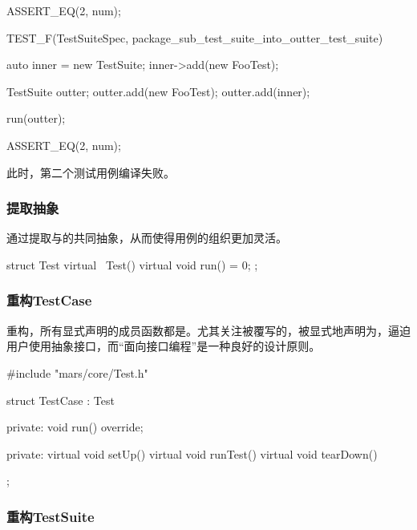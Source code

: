 \begin{content}
\begin{leftbar}
\begin{c++}[caption={\ttfamily{test/mars/core/TestSuiteSpec.cc}}]
{  ASSERT_EQ(2, num);
}

TEST_F(TestSuiteSpec, package_sub_test_suite_into_outter_test_suite) {
  auto inner = new TestSuite;
  inner->add(new FooTest);

  TestSuite outter;
  outter.add(new FooTest);
  outter.add(inner);

  run(outter);

  ASSERT_EQ(2, num);
}
 \end{c++}
\end{leftbar}

此时，第二个测试用例编译失败。

\subsubsection{提取抽象}

通过提取与的共同抽象，从而使得用例的组织更加灵活。

\begin{leftbar}
 \begin{c++}[caption={\ttfamily{include/mars/core/Test.h}}]
struct Test {
  virtual ~Test() {}
  virtual void run() = 0;
};
 \end{c++}
\end{leftbar}

\subsubsection{重构TestCase}

重构，所有显式声明的成员函数都是。尤其关注被覆写的，被显式地声明为，逼迫用户使用抽象接口，而“面向接口编程”是一种良好的设计原则。

\begin{leftbar}
 \begin{c++}[caption={\ttfamily{include/mars/core/TestCase.h}}]
#include "mars/core/Test.h"

struct TestCase : Test {
private:
  void run() override;

private:
  virtual void setUp() {}
  virtual void runTest() {}
  virtual void tearDown() {}
};
 \end{c++}
\end{leftbar}

\subsubsection{重构TestSuite}


\end{content}
